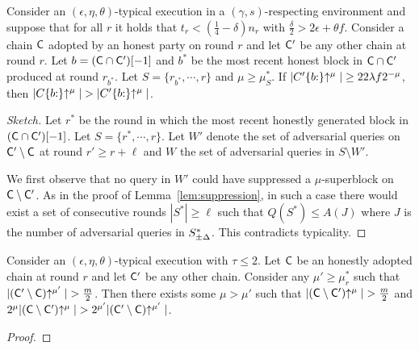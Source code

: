 \begin{theorem}\label{thm:varscp}
  Consider an $(\epsilon, \eta, \theta)$-typical execution in a
  $(\gamma, s)$-respecting environment and suppose that for all $r$ it holds
  that $t_r < (\frac{1}{4} - \delta)n_r$ with
  $\frac{\delta}{2} > 2\epsilon + \theta f$.
  Consider a chain $\mathsf{C}$ adopted by an honest party on round $r$ and let
  $\mathsf{C}'$ be any other chain at round $r$. Let $b =
  (\mathsf{C}\cap\mathsf{C}')[-1]$ and $b^*$ be the most recent honest block in
  $\mathsf{C}\cap\mathsf{C}'$ produced at round $r_{b^*}$. Let $S = \{ r_{b^*}, \cdots,
  r \}$ and $\mu \geq \mu^*_S$. If $|C'\{b{:}\}\negthickspace\uparrow^\mu| \geq 22\lambda
  f 2^{-\mu}$, then $|C\{b{:}\}\negthickspace\uparrow^\mu| >
  |C'\{b{:}\}\negthickspace\uparrow^\mu|$.
\end{theorem}
\begin{proof}[Sketch]
  Let $r^*$ be the round in which the most recent honestly generated block in
  $(\mathsf{C} \cap \mathsf{C}')[-1]$.
  Let $S = \{r^*, \cdots, r\}$. Let $W'$ denote the set of adversarial queries
  on $\mathsf{C}' \setminus \mathsf{C}$ at round $r' \geq r + \ell$ and
  $W$ the set of adversarial queries in $S \setminus W'$.

  We first observe that no query in $W'$ could have suppressed a
  $\mu$-superblock on $\mathsf{C}\setminus\mathsf{C}'$. As in the proof of
  Lemma~\ref{lem:suppression}, in such a case there would exist a set of consecutive
  rounds $|S^*| \geq \ell$ such that $Q(S^*) \leq A(J)$ where $J$ is the number
  of adversarial queries in $S^*_{\pm\Delta}$. This contradicts typicality.

\end{proof}

\begin{lemma}
  Consider an $(\epsilon, \eta, \theta)$-typical execution with $\tau \leq 2$.
  Let $\mathsf{C}$ be an honestly adopted chain at round $r$ and let $\mathsf{C}'$ be
  any other chain. Consider any $\mu' \geq \mu^*_r$ such that
  $|(\mathsf{C}'\setminus\mathsf{C})\negthickspace\uparrow^{\mu'}| > \frac{m}{2}$. Then there exists
  some $\mu > \mu'$ such that $|(\mathsf{C}\setminus\mathsf{C}')\negthickspace\uparrow^\mu| >
  \frac{m}{2}$ and $2^\mu|(\mathsf{C}\setminus\mathsf{C}')\negthickspace\uparrow^\mu| >
  2^{\mu'}|(\mathsf{C}'\setminus\mathsf{C})\negthickspace\uparrow^{\mu'}|$.
\end{lemma}
\ifdraft
\begin{proof}
\end{proof}
\fi

